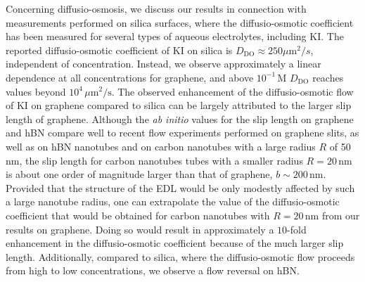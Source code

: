 \documentclass[journal=ancac3,manuscript=article,layout=twocolumn]{achemso}
\begin{document}
Concerning diffusio-osmosis,
we discuss our results in connection with
measurements performed on silica surfaces,
where the diffusio-osmotic coefficient has
been measured for several types of aqueous electrolytes, including KI\cite{Lee2014b}.
The reported diffusio-osmotic coefficient of KI on silica
is $D_\mathrm{DO} \approx 250 \mu\text{m}^2/s$,
independent of concentration.
Instead, we observe approximately a linear dependence
at all concentrations for graphene, and
above $10^{-1}$\,M $D_\mathrm{DO}$ reaches values beyond
$10^{4}\,\mu\text{m}^2/\text{s}$.
The observed enhancement of
the diffusio-osmotic flow
of KI on graphene compared to
silica can be largely attributed to the larger slip length of graphene.
Although the \textit{ab initio} values
for the slip length on graphene and
hBN\cite{tocci2020nanoscale}
compare well to recent flow  experiments performed on graphene slits\cite{xie2018fast},
as well as on hBN nanotubes and on carbon nanotubes
with a large radius $R$ of 50\,nm\cite{secchi2016massive},
the slip length for carbon nanotubes tubes
with a smaller radius $R=20$\,nm
is about one order of magnitude
larger than that of graphene, $b\sim 200$\,nm.
Provided that the structure of the EDL
would be only modestly affected
by such a large nanotube radius, one can extrapolate
the value of the diffusio-osmotic
coefficient that would be obtained for carbon
nanotubes with $R=20$\,nm from our results on graphene.
Doing so would result in approximately a $10$-fold
enhancement in the diffusio-osmotic
coefficient because of the much larger slip length.
Additionally, compared to silica,
where the diffusio-osmotic flow proceeds
from high to low concentrations,
we observe a flow reversal on hBN.
\end{document}
